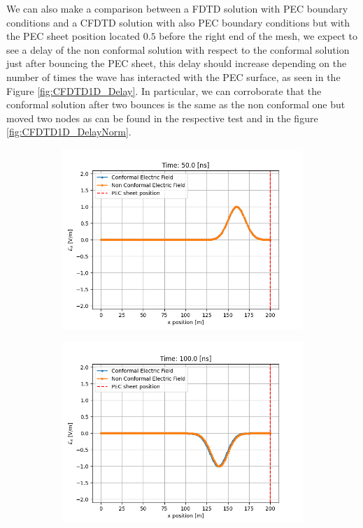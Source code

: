 \documentclass[12pt, oneside]{book}
\begin{document}
We can also make a comparison between a FDTD solution with PEC boundary conditions and a CFDTD solution with also PEC boundary conditions but with the PEC sheet position located $0.5$ before the right end of the mesh, we expect to see a delay of the non conformal solution with respect to the conformal solution just after bouncing the PEC sheet, this delay should increase depending on the number of times the wave has interacted with the PEC surface, as seen in the Figure \ref{fig:CFDTD1D_Delay}. In particular, we can corroborate that the conformal solution after two bounces is the same as the non conformal one but moved two nodes as can be found in the respective test and in the figure \ref{fig:CFDTD1D_DelayNorm}. 

\begin{figure}[h!]
    \centering
    \begin{subfigure}[b]{0.49\textwidth}
        \centering
        \includegraphics[width=\textwidth]{Imagenes/CFDTD1D_Comparison1.png}
    \end{subfigure}
    \begin{subfigure}[b]{0.49\textwidth}
        \centering
        \includegraphics[width=\textwidth]{Imagenes/CFDTD1D_Comparison2.png}
    \end{subfigure}


\end{figure}
\end{document}
